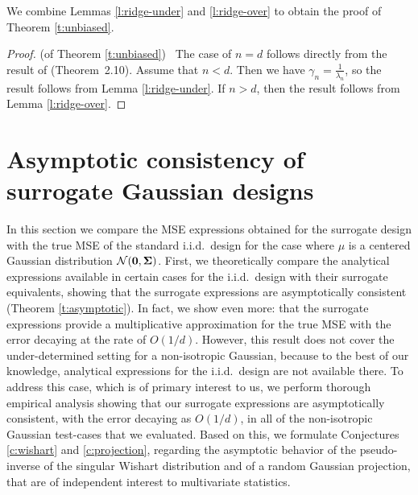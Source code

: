 \documentclass[11pt]{article}
\begin{document}
We combine Lemmas \ref{l:ridge-under} and \ref{l:ridge-over} to obtain
the proof of Theorem \ref{t:unbiased}.
\begin{proof} (of Theorem \ref{t:unbiased}) \
The case of $n=d$ follows directly from the result of
\cite{correcting-bias} (Theorem~2.10). 
Assume that $n<d$. Then we have
$\gamma_n=\frac1{\lambda_n}$, so the result follows
from Lemma \ref{l:ridge-under}.
If $n>d$, then the result follows from Lemma \ref{l:ridge-over}.
\end{proof}



\section{Asymptotic consistency of surrogate Gaussian designs}
\label{s:asymptotic}
In this section we compare the MSE expressions obtained for the
surrogate design with the true MSE of the standard i.i.d.~design for
the case where $\mu$ is a centered Gaussian distribution
$\mathcal{N}(\mathbf 0,\mathbf{\Sigma})$. First, we theoretically compare the analytical
expressions available in certain cases for the i.i.d.~design with their
surrogate equivalents, showing that the surrogate expressions are
asymptotically consistent (Theorem \ref{t:asymptotic}). In fact, we
show even more: that the surrogate expressions provide a
multiplicative approximation for the true MSE with the error decaying
at the rate of $O(1/d)$. However, this result
does not cover the under-determined setting for a non-isotropic
Gaussian, because to the best of our knowledge, analytical expressions
for the i.i.d.~design are not available there. To address this case,
which is of primary interest to us, we perform thorough empirical
analysis showing that our surrogate expressions are asymptotically
consistent, with the error decaying as $O(1/d)$, in all of the
non-isotropic Gaussian test-cases that we evaluated. Based on 
this, we formulate Conjectures \ref{c:wishart} and \ref{c:projection},
regarding the asymptotic behavior of the pseudo-inverse of the
singular Wishart distribution and of a random Gaussian projection, that
are of independent interest to multivariate statistics.
\end{document}
